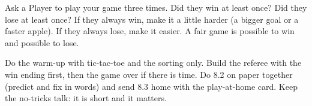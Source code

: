 \begin{stretchchallenge}[Is it fair?]
Ask a Player to play your game three times. Did they win at least once? Did they lose at least once? If they always win, make it a little harder (a bigger goal or a faster apple). If they always lose, make it easier. A fair game is possible to win and possible to lose.
\end{stretchchallenge}

\begin{teachernote}
Do the warm-up with tic-tac-toe and the sorting only. Build the referee with the win ending first, then the game over if there is time. Do 8.2 on paper together (predict and fix in words) and send 8.3 home with the play-at-home card. Keep the no-tricks talk: it is short and it matters.
\end{teachernote}
